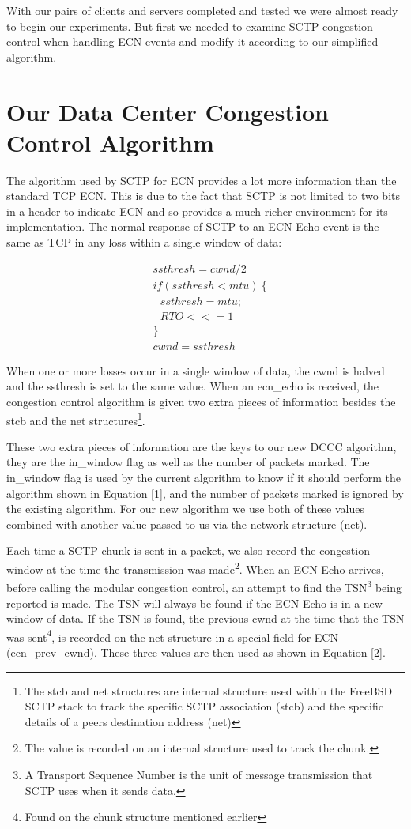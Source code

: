 \documentclass[12pt]{article}
\begin{document}
With our pairs of clients and servers completed and tested we were almost ready to 
begin our experiments. But first we needed to examine SCTP congestion control
when handling ECN events and modify it according to our simplified algorithm.

\section{Our Data Center Congestion Control Algorithm}
\label{algo}
The algorithm used by SCTP for ECN provides a lot more information than
the standard TCP ECN. This is due to the fact that SCTP is not limited to two bits
in a header to indicate ECN and so provides a much richer environment for its
implementation. The normal response of SCTP to an ECN Echo event is the same
as TCP in any loss within a single window of data:

\begin{equation}
\begin{split}
&ssthresh = cwnd / 2\\
&if (ssthresh < mtu)~\{ \\
&~~~ssthresh = mtu; \\
&~~~RTO <<= 1\\
&\} \\
&cwnd = ssthresh
\end{split}
\label{algo1}
\end{equation}

When one or more losses occur in a single window of data, the cwnd is halved and
the ssthresh is set to the same value. When an ecn\_echo is received, the congestion
control algorithm is given two extra pieces of information besides the stcb and the 
net structures\footnote{The stcb and net structures are internal structure used within the FreeBSD SCTP
stack to track the specific SCTP association (stcb) and the specific details of a peers destination
address (net)}.

These two extra pieces of information are the keys to our new DCCC algorithm, they are
the in\_window flag as well as the number of packets marked. The in\_window flag
is used by the current algorithm to know if it should perform the
algorithm shown in Equation [1],  and
the number of packets marked is ignored by the existing algorithm. For
our new algorithm we use both of these values combined with another value passed
to us via the network structure (net).

Each time a SCTP chunk is sent in a packet, we also record the congestion
window at the time the transmission was made\footnote{The value is recorded
on an internal structure used to track the chunk.}. When an ECN Echo arrives, before calling
the modular congestion control, an attempt to find the
TSN\footnote{A Transport Sequence Number is the unit of message transmission that
SCTP uses when it sends data.}  being reported is made. The TSN
will always be found if the ECN Echo is in a new window of data. If the TSN
is found, the previous cwnd at the time that the TSN was sent\footnote{Found on the chunk structure mentioned earlier}, is recorded on
the net structure in a special field for ECN (ecn\_prev\_cwnd).  These three values are then used as shown in Equation [2].
\end{document}
